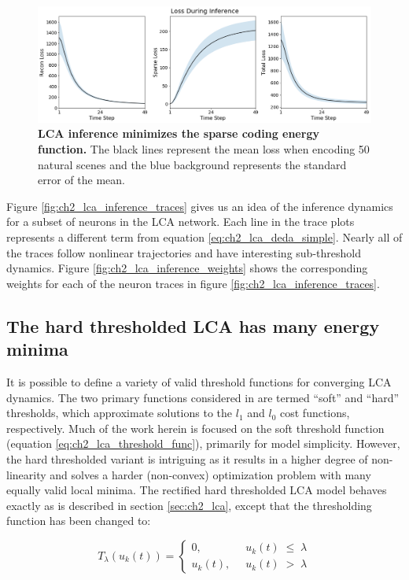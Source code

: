 \begin{figure}[h]
    \centering
    \includegraphics[width=\textwidth]{figures/lca_inference_loss.png}
    \caption{\textbf{LCA inference minimizes the sparse coding energy function.} The black lines represent the mean loss when encoding 50 natural scenes and the blue background represents the standard error of the mean.}
    \label{fig:ch2_lca_inference_loss}
\end{figure}

Figure \ref{fig:ch2_lca_inference_traces} gives us an idea of the inference dynamics for a subset of neurons in the LCA network. Each line in the trace plots represents a different term from equation \eqref{eq:ch2_lca_deda_simple}. Nearly all of the traces follow nonlinear trajectories and have interesting sub-threshold dynamics. Figure \ref{fig:ch2_lca_inference_weights} shows the corresponding weights for each of the neuron traces in figure \ref{fig:ch2_lca_inference_traces}.


\subsection{The hard thresholded LCA has many energy minima}\label{sec:ch2_hard_lca}
It is possible to define a variety of valid threshold functions for converging LCA dynamics. The two primary functions considered in \parencite{rozell2008sparse} are termed ``soft'' and ``hard'' thresholds, which approximate solutions to the $l_{1}$ and $l_{0}$ cost functions, respectively. Much of the work herein is focused on the soft threshold function (equation  \ref{eq:ch2_lca_threshold_func}), primarily for model simplicity. However, the hard thresholded variant is intriguing as it results in a higher degree of non-linearity and solves a harder (non-convex) optimization problem with many equally valid local minima. The rectified hard thresholded LCA model behaves exactly as is described in section \ref{sec:ch2_lca}, except that the thresholding function has been changed to:

\begin{equation}\label{eq:ch2_lca_hard_threshold_func}
    T_{\lambda}(u_{k}(t)) = \left\{
    \begin{aligned}
        0,\;\; &u_{k}(t)\; \leq\; \lambda \\
        u_{k}(t),\;\; &u_{k}(t)\; >\; \lambda
    \end{aligned}
    \right.
\end{equation}

